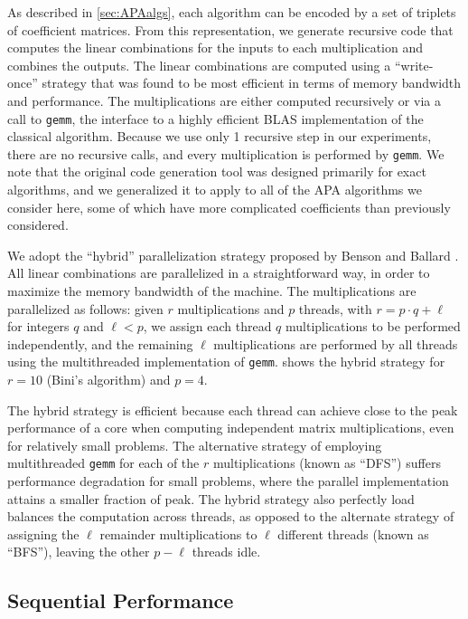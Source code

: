 \documentclass[sigconf,review,anonymous]{acmart}
\begin{document}
As described in \cref{sec:APAalgs}, each algorithm can be encoded by a set of triplets of coefficient matrices.
From this representation, we generate recursive code that computes the linear combinations for the inputs to each multiplication and combines the outputs.
The linear combinations are computed using a ``write-once'' strategy that was found to be most efficient in terms of memory bandwidth and performance.
The multiplications are either computed recursively or via a call to \texttt{gemm}, the interface to a highly efficient BLAS implementation of the classical algorithm.
Because we use only 1 recursive step in our experiments, there are no recursive calls, and every multiplication is performed by \texttt{gemm}.
We note that the original code generation tool was designed primarily for exact algorithms, and we generalized it to apply to all of the APA algorithms we consider here, some of which have more complicated coefficients than previously considered.

We adopt the ``hybrid'' parallelization strategy proposed by Benson and Ballard \cite{BB15}.
All linear combinations are parallelized in a straightforward way, in order to maximize the memory bandwidth of the machine.
The multiplications are parallelized as follows: given $r$ multiplications and $p$ threads, with $r=p\cdot q + \ell$ for integers $q$ and $\ell<p$, we assign each thread $q$ multiplications to be performed independently, and the remaining $\ell$ multiplications are performed by all threads using the multithreaded implementation of \texttt{gemm}.
 shows the hybrid strategy for $r=10$ (Bini's algorithm) and $p=4$.



The hybrid strategy is efficient because each thread can achieve close to the peak performance of a core when computing independent matrix multiplications, even for relatively small problems.
The alternative strategy of employing multithreaded \texttt{gemm} for each of the $r$ multiplications (known as ``DFS'') suffers performance degradation for small problems, where the parallel implementation attains a smaller fraction of peak.
The hybrid strategy also perfectly load balances the computation across threads, as opposed to the alternate strategy of assigning the $\ell$ remainder multiplications to $\ell$ different threads (known as ``BFS''), leaving the other $p-\ell$ threads idle.

\subsection{Sequential Performance}
\end{document}
